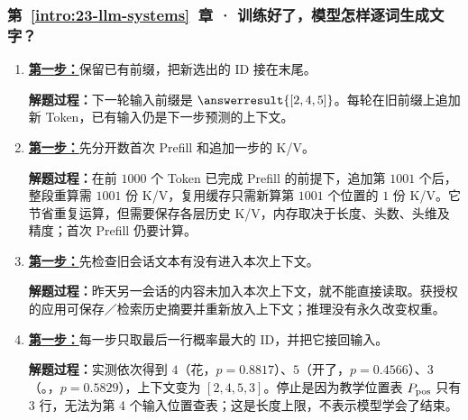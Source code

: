 \subsubsection*{第~\ref*{intro:23-llm-systems}~章 · 训练好了，模型怎样逐词生成文字？}
\begin{enumerate}[label={},leftmargin=4.8em,itemsep=4pt]
\item[\textbf{C-083.}] \leavevmode{}\label{solution:C-083}\label{solution:generation-prefix-append}\hyperref[exercise:generation-prefix-append]{\textbf{第一步：}}保留已有前缀，把新选出的 ID 接在末尾。\par\nobreak
\textbf{解题过程：}下一轮输入前缀是 $\answerresult{[2,4,5]}$。每轮在旧前缀上追加新 Token，已有输入仍是下一步预测的上下文。
\item[\textbf{C-084.}] \leavevmode{}\label{solution:C-084}\label{solution:cached-next-token}\hyperref[exercise:cached-next-token]{\textbf{第一步：}}先分开数首次 Prefill 和追加一步的 K/V。\par\nobreak\textbf{解题过程：}在前 $1000$ 个 Token 已完成 Prefill 的前提下，追加第 $1001$ 个后，整段重算需 $1001$ 份 K/V，复用缓存只需新算第 $1001$ 个位置的 $1$ 份 K/V。它节省重复运算，但需要保存各层历史 K/V，内存取决于长度、头数、头维及精度；首次 Prefill 仍要计算。
\item[\textbf{C-085.}] \leavevmode{}\label{solution:C-085}\label{solution:context-window-memory}\hyperref[exercise:context-window-memory]{\textbf{第一步：}}先检查旧会话文本有没有进入本次上下文。\par\nobreak\textbf{解题过程：}昨天另一会话的内容未加入本次上下文，就不能直接读取。获授权的应用可保存／检索历史摘要并重新放入上下文；推理没有永久改变权重。
\item[\textbf{C-086.}] \leavevmode{}\label{solution:C-086}\label{solution:greedy-generation}\hyperref[exercise:greedy-generation]{\textbf{第一步：}}每一步只取最后一行概率最大的 ID，并把它接回输入。\par\nobreak
\textbf{解题过程：}实测依次得到 $4$（花，$p=0.8817$）、$5$（开了，$p=0.4566$）、$3$（。，$p=0.5829$），上下文变为 $[2,4,5,3]$。停止是因为教学位置表 $P_{\rm pos}$ 只有 3 行，无法为第 4 个输入位置查表；这是长度上限，不表示模型学会了结束。
\end{enumerate}
